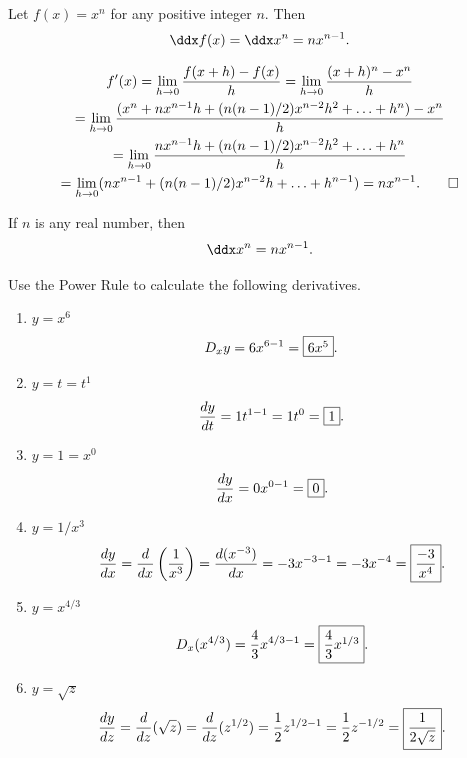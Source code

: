 \documentclass{book}
\begin{document}
\begin{Thm} Let $f(x) = x^n$ for any positive integer $n$. Then \[\ddx f(x) = \ddx x^n = nx^{n-1}.\]\end{Thm}

\begin{pf}\mbox{}\vspace{-30pt}

\begin{multline*}
f'(x)  = \lim_{h\to 0} \dfrac{f(x+h) - f(x)}{h}  = \lim_{h\to 0} \dfrac{(x+h)^n- x^n}{h} \\
=\lim_{h\to 0} \dfrac{(x^n + nx^{n-1}h + (n(n-1)/2)x^{n-2}h^2 + \ldots + h^n) - x^n}{h}\\
=\lim_{h\to 0} \dfrac{nx^{n-1}h + (n(n-1)/2)x^{n-2}h^2 + \ldots + h^n}{h}\\
=\lim_{h\to 0} (nx^{n-1} + (n(n-1)/2)x^{n-2}h + \ldots + h^{n-1}) = nx^{n-1}. \qedhere
\end{multline*}
\end{pf}\vs

\begin{Thm} If $n$ is any real number, then \[\ddx x^n = nx^{n-1}.\] \end{Thm}\vs

\begin{Exam} Use the Power Rule to calculate the following derivatives.
\begin{enumerate}
\item $y = x^6$\
\[D_xy = 6x^{6-1} = \fbox{$6x^5$}.\]

\item $y = t = t^1$
\[\dfrac{dy}{dt} = 1t^{1-1} = 1t^0 = \fbox{$1$}.\]

\item $y = 1 = x^0$
\[\dfrac{dy}{dx} = 0x^{0-1} = \fbox{$0$}.\]

\item $y = 1/x^3$
\[\dfrac{dy}{dx} = \dfrac{d}{dx}\left(\dfrac{1}{x^3}\right) = \dfrac{d(x^{-3})}{dx} = -3x^{-3-1}  = -3x^{-4} = \fbox{$\dfrac{-3}{x^4}$}.\]

\item $y=x^{4/3}$
\[D_x(x^{4/3}) = \frac{4}{3}x^{4/3-1} = \fbox{$\dfrac{4}{3}x^{1/3}$}.\]

\item $y = \sqrt{z}$
\[\dfrac{dy}{dz} = \dfrac{d}{dz}(\sqrt{z}) = \dfrac{d}{dz}(z^{1/2}) = \frac{1}{2}z^{1/2-1} = \frac{1}{2}z^{-1/2} = \fbox{$\dfrac{1}{2\sqrt{z}}$}.\]
\end{enumerate}
\end{Exam}\vs
\end{document}
